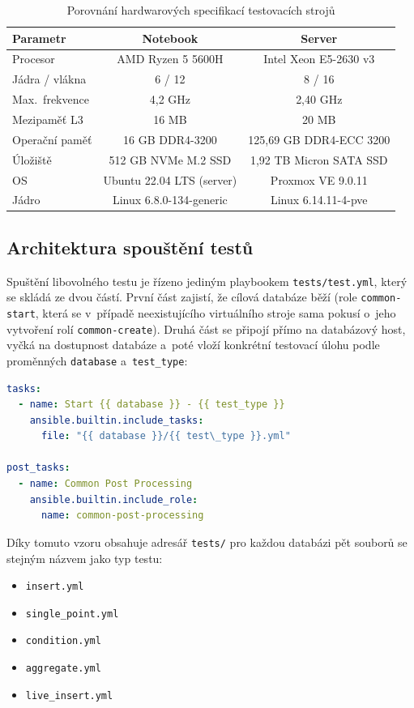 \begin{table}[H]
\centering
\caption{Porovnání hardwarových specifikací testovacích strojů}
\label{tab:hardwarespecs}
\begin{tabular}{@{}lcc@{}}
\toprule
\textbf{Parametr} & \textbf{Notebook} & \textbf{Server} \\
\midrule
Procesor & AMD Ryzen 5 5600H & Intel Xeon E5-2630 v3 \\
Jádra / vlákna & 6 / 12 & 8 / 16 \\
Max.\ frekvence & 4,2 GHz & 2,40 GHz \\
Mezipaměť L3 & 16 MB & 20 MB \\
Operační paměť & 16 GB DDR4-3200 & 125,69 GB DDR4-ECC 3200 \\
Úložiště & 512 GB NVMe M.2 SSD & 1,92 TB Micron SATA SSD \\
OS & Ubuntu 22.04 LTS (server) & Proxmox VE 9.0.11 \\
Jádro & Linux 6.8.0-134-generic & Linux 6.14.11-4-pve \\
\bottomrule
\end{tabular}
\end{table}

\subsection{Architektura spouštění testů}
\label{sec:implementacetestu}

Spuštění libovolného testu je řízeno jediným playbookem \texttt{tests/test.yml}, který se skládá ze dvou částí. 
První část zajistí, že cílová databáze běží (role \texttt{common-start}, která se v~případě neexistujícího virtuálního stroje sama pokusí o~jeho vytvoření rolí \texttt{common-create}). 
Druhá část se připojí přímo na databázový host, vyčká na dostupnost databáze a~poté vloží konkrétní testovací úlohu podle proměnných \texttt{database} a~\texttt{test\_type}:

\begin{lstlisting}[language=YAML, caption={Výřez z~tests/test.yml}, label={lst:testyml}, captionpos=b]
tasks:
  - name: Start {{ database }} - {{ test_type }}
    ansible.builtin.include_tasks:
      file: "{{ database }}/{{ test\_type }}.yml"

post_tasks:
  - name: Common Post Processing
    ansible.builtin.include_role:
      name: common-post-processing
\end{lstlisting}

Díky tomuto vzoru obsahuje adresář \texttt{tests/} pro každou databázi pět souborů se stejným názvem jako typ testu:
\begin{itemize}
    \item \texttt{insert.yml}
    \item \texttt{single\_point.yml}
    \item \texttt{condition.yml}
    \item \texttt{aggregate.yml}
    \item \texttt{live\_insert.yml}
\end{itemize}

